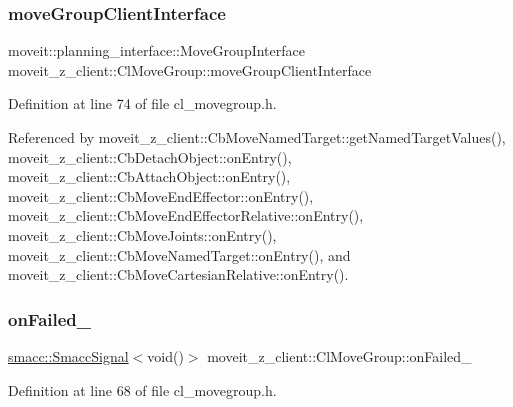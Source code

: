 \subsubsection{\texorpdfstring{move\+Group\+Client\+Interface}{moveGroupClientInterface}}
{\footnotesize\ttfamily moveit\+::planning\+\_\+interface\+::\+Move\+Group\+Interface moveit\+\_\+z\+\_\+client\+::\+Cl\+Move\+Group\+::move\+Group\+Client\+Interface}



Definition at line 74 of file cl\+\_\+movegroup.\+h.



Referenced by moveit\+\_\+z\+\_\+client\+::\+Cb\+Move\+Named\+Target\+::get\+Named\+Target\+Values(), moveit\+\_\+z\+\_\+client\+::\+Cb\+Detach\+Object\+::on\+Entry(), moveit\+\_\+z\+\_\+client\+::\+Cb\+Attach\+Object\+::on\+Entry(), moveit\+\_\+z\+\_\+client\+::\+Cb\+Move\+End\+Effector\+::on\+Entry(), moveit\+\_\+z\+\_\+client\+::\+Cb\+Move\+End\+Effector\+Relative\+::on\+Entry(), moveit\+\_\+z\+\_\+client\+::\+Cb\+Move\+Joints\+::on\+Entry(), moveit\+\_\+z\+\_\+client\+::\+Cb\+Move\+Named\+Target\+::on\+Entry(), and moveit\+\_\+z\+\_\+client\+::\+Cb\+Move\+Cartesian\+Relative\+::on\+Entry().

\mbox{\label{classmoveit__z__client_1_1ClMoveGroup_ab9f19c609cfa111748bc16d497dffe9a}} 
\subsubsection{\texorpdfstring{on\+Failed\+\_\+}{onFailed\_}}
{\footnotesize\ttfamily \hyperlink{classsmacc_1_1SmaccSignal}{smacc\+::\+Smacc\+Signal}$<$void()$>$ moveit\+\_\+z\+\_\+client\+::\+Cl\+Move\+Group\+::on\+Failed\+\_\+\hspace{0.3cm}{\ttfamily [private]}}



Definition at line 68 of file cl\+\_\+movegroup.\+h.

\mbox{\label{classmoveit__z__client_1_1ClMoveGroup_a77804970cc1e2ae64e26dabbf556352d}} 
